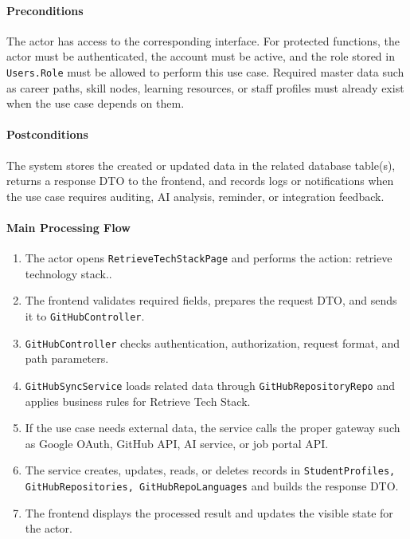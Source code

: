\paragraph{Preconditions}

The actor has access to the corresponding interface. For protected functions, the actor must be authenticated, the account must be active, and the role stored in \texttt{Users.Role} must be allowed to perform this use case. Required master data such as career paths, skill nodes, learning resources, or staff profiles must already exist when the use case depends on them.

\paragraph{Postconditions}

The system stores the created or updated data in the related database table(s), returns a response DTO to the frontend, and records logs or notifications when the use case requires auditing, AI analysis, reminder, or integration feedback.

\paragraph{Main Processing Flow}

\begin{enumerate}
    \item The actor opens \texttt{RetrieveTechStackPage} and performs the action: retrieve technology stack..
    \item The frontend validates required fields, prepares the request DTO, and sends it to \texttt{GitHubController}.
    \item \texttt{GitHubController} checks authentication, authorization, request format, and path parameters.
    \item \texttt{GitHubSyncService} loads related data through \texttt{GitHubRepositoryRepo} and applies business rules for Retrieve Tech Stack.
    \item If the use case needs external data, the service calls the proper gateway such as Google OAuth, GitHub API, AI service, or job portal API.
    \item The service creates, updates, reads, or deletes records in \texttt{StudentProfiles, GitHubRepositories, GitHubRepoLanguages} and builds the response DTO.
    \item The frontend displays the processed result and updates the visible state for the actor.
\end{enumerate}


